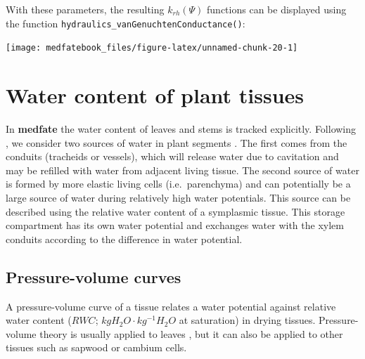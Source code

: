 \documentclass[]{book}
\begin{document}
With these parameters, the resulting \(k_{rh}(\Psi)\) functions can be displayed using the function \texttt{hydraulics\_vanGenuchtenConductance()}:

\begin{center}\texttt{[image: medfatebook\_files/figure-latex/unnamed-chunk-20-1]} \end{center}

\hypertarget{water-content-of-plant-tissues}{%
\section{Water content of plant tissues}\label{water-content-of-plant-tissues}}

In \textbf{medfate} the water content of leaves and stems is tracked explicitly. Following \citet{Martin-StPaul2017}, we consider two sources of water in plant segments \citep{Tyree1990}. The first comes from the conduits (tracheids or vessels), which will release water due to cavitation and may be refilled with water from adjacent living tissue. The second source of water is formed by more elastic living cells (i.e.~parenchyma) and can potentially be a large source of water during relatively high water potentials. This source can be described using the relative water content of a symplasmic tissue. This storage compartment has its own water potential and exchanges water with the xylem conduits according to the difference in water potential.

\hypertarget{pressure-volume-curves}{%
\subsection{Pressure-volume curves}\label{pressure-volume-curves}}

A pressure-volume curve of a tissue relates a water potential against relative water content (\(RWC\); \(kg H_2O \cdot kg^{-1}H_2O\) at saturation) in drying tissues. Pressure-volume theory is usually applied to leaves \citep{Bartlett2012}, but it can also be applied to other tissues such as sapwood or cambium cells.
\end{document}

